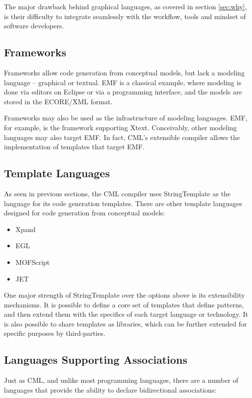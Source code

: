 The major drawback behind graphical languages,
as covered in section \ref{sec:why},
is their difficulty to integrate seamlessly with the workflow, tools and mindset of software developers.

\subsection{Frameworks}

Frameworks allow code generation from conceptual models, but lack a modeling language -- graphical or textual. 
EMF is a classical example,
where modeling is done via editors on Eclipse or via a programming interface,
and the models are stored in the ECORE/XML format. 

Frameworks may also be used as the infrastructure of modeling languages.
EMF, for example, is the framework supporting Xtext.
Conceivably, other modeling languages may also target EMF.
In fact, CML's extensible compiler allows the implementation of templates that target EMF.

\subsection{Template Languages}

As seen in previous sections,
the CML compiler uses StringTemplate as the language for its code generation templates.
There are other template languages designed for code generation from conceptual models:

\begin{itemize}
\item Xpand
\item EGL
\item MOFScript
\item JET
\end{itemize}

One major strength of StringTemplate over the options above is its extensibility mechanisms.
It is possible to define a core set of templates that define patterns, 
and then extend them with the specifics of each target language or technology.
It is also possible to share templates as libraries,
which can be further extended for specific purposes by third-parties.

\subsection{Languages Supporting Associations}

Just as CML,
and unlike most programming languages,
there are a number of languages that provide the ability to declare bidirectional associations:

